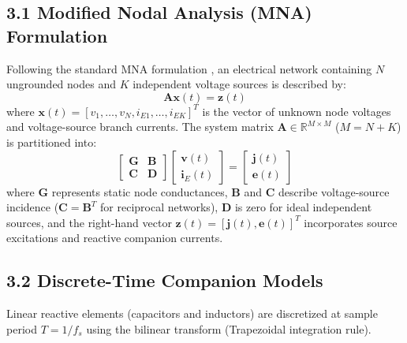 \documentclass[fleqn,draft]{jaes}
\begin{document}
\subsection{3.1 Modified Nodal Analysis (MNA) Formulation}
Following the standard MNA formulation \cite{ho1975modified, yeh2007automated}, an electrical network containing $N$ ungrounded nodes and $K$ independent voltage sources is described by:
\begin{equation}
\mathbf{A} \mathbf{x}(t) = \mathbf{z}(t)
\end{equation}
where $\mathbf{x}(t) = [v_1, \dots, v_N, i_{E1}, \dots, i_{EK}]^T$ is the vector of unknown node voltages and voltage-source branch currents. The system matrix $\mathbf{A} \in \mathbb{R}^{M \times M}$ ($M = N + K$) is partitioned into:
\begin{equation}
\begin{bmatrix} \mathbf{G} & \mathbf{B} \\ \mathbf{C} & \mathbf{D} \end{bmatrix} \begin{bmatrix} \mathbf{v}(t) \\ \mathbf{i}_E(t) \end{bmatrix} = \begin{bmatrix} \mathbf{j}(t) \\ \mathbf{e}(t) \end{bmatrix}
\end{equation}
where $\mathbf{G}$ represents static node conductances, $\mathbf{B}$ and $\mathbf{C}$ describe voltage-source incidence ($\mathbf{C} = \mathbf{B}^T$ for reciprocal networks), $\mathbf{D}$ is zero for ideal independent sources, and the right-hand vector $\mathbf{z}(t) = [\mathbf{j}(t), \mathbf{e}(t)]^T$ incorporates source excitations and reactive companion currents.

\subsection{3.2 Discrete-Time Companion Models}
Linear reactive elements (capacitors and inductors) are discretized at sample period $T = 1 / f_s$ using the bilinear transform (Trapezoidal integration rule).
\end{document}
